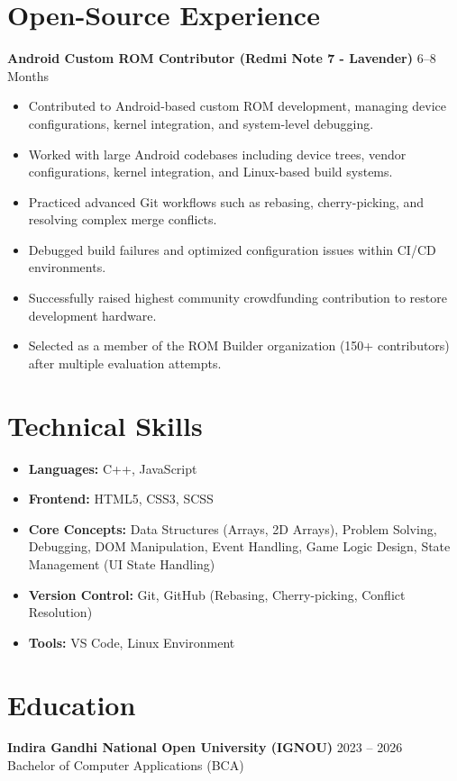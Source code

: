 \section*{Open-Source Experience}

\textbf{Android Custom ROM Contributor (Redmi Note 7 - Lavender)} \hfill 6--8 Months

\begin{itemize}
	\item Contributed to Android-based custom ROM development, managing device configurations, kernel integration, and system-level debugging.
	\item Worked with large Android codebases including device trees, vendor configurations, kernel integration, and Linux-based build systems.
	\item Practiced advanced Git workflows such as rebasing, cherry-picking, and resolving complex merge conflicts.
	\item Debugged build failures and optimized configuration issues within CI/CD environments.
	\item Successfully raised highest community crowdfunding contribution to restore development hardware.
	\item Selected as a member of the ROM Builder organization (150+ contributors) after multiple evaluation attempts.
\end{itemize}

\section*{Technical Skills}

\begin{itemize}
	\item \textbf{Languages:} C++, JavaScript
	\item \textbf{Frontend:} HTML5, CSS3, SCSS
    \item \textbf{Core Concepts:} Data Structures (Arrays, 2D Arrays), Problem Solving, Debugging, DOM Manipulation, Event Handling, Game Logic Design, State Management (UI State Handling)
	\item \textbf{Version Control:} Git, GitHub (Rebasing, Cherry-picking, Conflict Resolution)
	\item \textbf{Tools:} VS Code, Linux Environment
\end{itemize}

\section*{Education}

\textbf{Indira Gandhi National Open University (IGNOU)} \hfill 2023 -- 2026 \\
Bachelor of Computer Applications (BCA)

